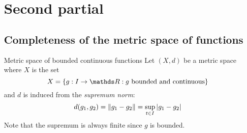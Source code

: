 \documentclass[12pt]{extarticle}
\numberwithin{equation}{section}
\begin{document}
\section{Second partial}

\subsection{Completeness of the metric space of functions}

\begin{definition}{Metric space of bounded continuous functions}
    Let $(X, d)$ be a metric space where $X$ is the set
    \begin{equation}
        X = \{ g:I \to \R : g \text{ bounded and continuous} \}
    \end{equation}
    and $d$ is induced from the \emph{supremum norm}:
    \begin{equation}
        d(g_1, g_2) = \norm{g_1 - g_2} = \sup_{t \in I} \abs{g_1 - g_2}
    \end{equation}
    Note that the supremum is always finite since $g$ is bounded.
\end{definition}
\end{document}
